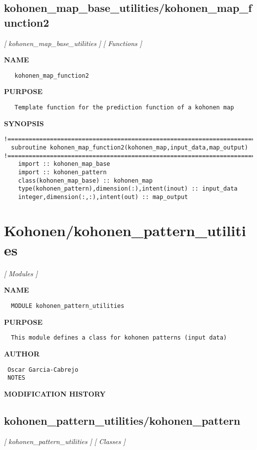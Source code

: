 \documentclass{article}
\begin{document}
\subsection{kohonen\_map\_base\_utilities/kohonen\_map\_function2}
\textsl{[ kohonen\_map\_base\_utilities ]}
\textsl{[ Functions ]}

\label{ch:robo22}
\label{ch:kohonen_map_base_utilities_kohonen_map_function2}
\textbf{NAME}
\begin{verbatim}
   kohonen_map_function2
\end{verbatim}
\textbf{PURPOSE}
\begin{verbatim}
   Template function for the prediction function of a kohonen map
\end{verbatim}
\textbf{SYNOPSIS}
\begin{verbatim}
!========================================================================================
  subroutine kohonen_map_function2(kohonen_map,input_data,map_output)
!========================================================================================
    import :: kohonen_map_base
    import :: kohonen_pattern
    class(kohonen_map_base) :: kohonen_map
    type(kohonen_pattern),dimension(:),intent(inout) :: input_data
    integer,dimension(:,:),intent(out) :: map_output
\end{verbatim}
\newpage
\section{Kohonen/kohonen\_pattern\_utilities}
\textsl{[ Modules ]}

\label{ch:robo5}
\label{ch:Kohonen_kohonen_pattern_utilities}
\textbf{NAME}
\begin{verbatim}
  MODULE kohonen_pattern_utilities
\end{verbatim}
\textbf{PURPOSE}
\begin{verbatim}
  This module defines a class for kohonen patterns (input data) 
\end{verbatim}
\textbf{AUTHOR}
\begin{verbatim}
 Oscar Garcia-Cabrejo
 NOTES 
\end{verbatim}
\textbf{MODIFICATION HISTORY}
\newpage
\subsection{kohonen\_pattern\_utilities/kohonen\_pattern}
\textsl{[ kohonen\_pattern\_utilities ]}
\textsl{[ Classes ]}
\end{document}
